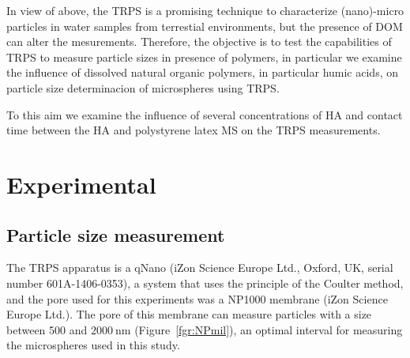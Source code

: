 \documentclass[journal=langd5,manuscript=article]{achemso}
\begin{document}

In view of above, the TRPS is a promising technique to characterize (nano)-micro particles in water samples from terrestial environments, but the presence of DOM can alter the mesurements. Therefore, the objective is to test the capabilities of TRPS to measure  particle sizes in presence of polymers, in particular   we examine the influence of dissolved natural organic polymers, in particular humic acids, on  particle size determinacion of microspheres using TRPS.

To this aim we examine the influence of several concentrations of HA and contact time between the HA and polystyrene latex MS on the TRPS measurements.





\section{Experimental} %
\subsection{Particle size measurement}
The TRPS apparatus is a qNano (iZon Science Europe Ltd., Oxford, UK, serial number 601A-1406-0353), a system that uses the principle of the Coulter method, and the pore used for this experiments was a NP1000 membrane (iZon Science Europe Ltd.). The pore of this membrane can measure particles with a size between 500 and $2000~\mathrm{nm}$ (Figure~\ref{fgr:NPmil}), an optimal interval for measuring the microspheres used in this study.
\end{document}
